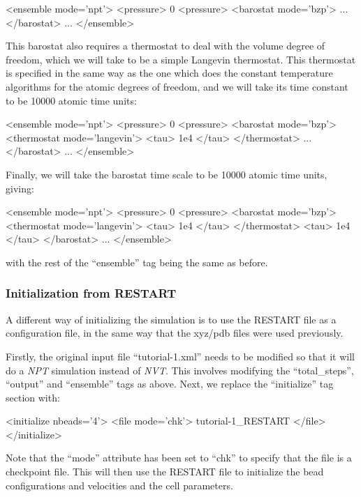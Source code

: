 \documentclass[11pt,english,fleqn]{report}
\newenvironment{code}{%
\footnotesize 
\verbatim
}{
\endverbatim
\normalsize
}
\begin{document}
\begin{code}
<ensemble mode='npt'>
   <pressure> 0 <pressure>
   <barostat mode='bzp'>
      ...
   </barostat>
   ...
</ensemble>
\end{code}

This barostat also requires a 
thermostat to deal with the volume degree of freedom, which we will take
to be a simple Langevin thermostat.
This thermostat is specified in the same way as the one which does the
constant temperature algorithms for the atomic degrees of freedom, and
we will take its time constant to be 10000 atomic time units:

\begin{code}
<ensemble mode='npt'>
   <pressure> 0 <pressure>
   <barostat mode='bzp'>
      <thermostat mode='langevin'>
         <tau> 1e4 </tau>
      </thermostat>
      ...
   </barostat>
   ...
</ensemble>
\end{code}

Finally, we will take the barostat time scale to be 10000 atomic time
units, giving:

\begin{code}
<ensemble mode='npt'>
   <pressure> 0 <pressure>
   <barostat mode='bzp'>
      <thermostat mode='langevin'>
         <tau> 1e4 </tau>
      </thermostat>
      <tau> 1e4 </tau>
   </barostat>
   ...
</ensemble>
\end{code}
with the rest of the {}``ensemble'' tag being the same as before.

\subsubsection{Initialization from RESTART}

A different way of initializing the simulation is to use the 
RESTART file as a configuration file, in the same way that
the xyz/pdb files were used previously.

Firstly, the original input file {}``tutorial-1.xml'' needs to
be modified so that
it will do a \emph{NPT} simulation instead of \emph{NVT}. This involves modifying
the {}``total\_steps'', {}``output'' and {}``ensemble'' tags as
above. Next, we replace the {}``initialize'' tag section with:

\begin{code}
<initialize nbeads='4'>
   <file mode='chk'> tutorial-1_RESTART </file>
</initialize>
\end{code}

Note that the {}``mode'' attribute has been set to {}``chk''
to specify that the file is a checkpoint file.
This will then use the RESTART file to initialize the bead
configurations and velocities and the cell parameters.
\end{document}
